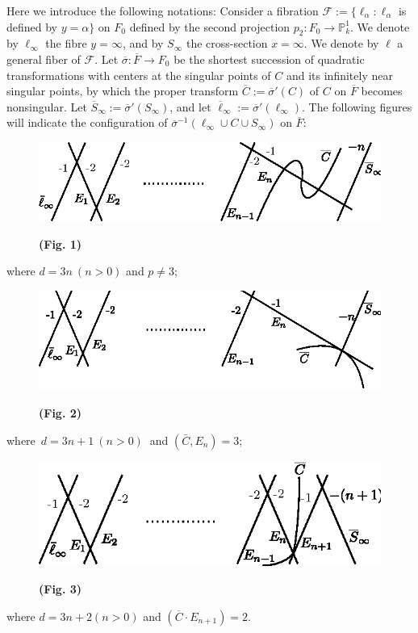 \subsubsection{}\label{chap3:2.5.1}
Here we introduce the following notations: Consider a fibration
$\mathscr{F}:=\{\ell_{\alpha}:\ell_{\alpha}$ is defined by
$y=\alpha\}$ on $F_{0}$ defined by the second projection
$p_{2}:F_{0}\to \mathbb{P}^{1}_{k}$. We denote by $\ell_{\infty}$ the
fibre $y=\infty$, and by $S_{\infty}$ the cross-section $x=\infty$. We
denote by $\ell$ a general fiber of $\mathscr{F}$. Let
$\overline{\sigma}:\overline{F}\to F_{0}$ be the shortest succession
of quadratic transformations with centers at the singular points of
$C$ and its infinitely near singular points, by which the proper
transform $\overline{C}:=\overline{\sigma}'(C)$ of $C$ on
$\overline{F}$ becomes nonsingular. Let
$\overline{S}_{\infty}:=\overline{\sigma}'(S_{\infty})$, and let
$\overline{\ell}_{\infty}:=\overline{\sigma}'(\ell_{\infty})$. The
following figures will indicate the configuration of
$\overline{\sigma}^{-1}(\ell_{\infty}\cup C\cup S_{\infty})$ on
$\overline{F}:$
\begin{figure}[H]
\centering
\includegraphics[scale=1.2]{figures/miyansi_fig1.eps}

\bigskip
\centerline{\bf(Fig. 1)}
\end{figure}
\noindent 
where $d=3n ~(n>0)$ and $p\neq 3$;

\begin{figure}[H]
\centering
\includegraphics[scale=1.2]{figures/miyansi_fig2.eps}

\bigskip
\centerline{\bf(Fig. 2)}
\end{figure}
\noindent
where\pageoriginale\ $d=3n+1 ~(n>0)~$ and $(\bar{C}, E_n)=3$;
\begin{figure}[H]
\centering
\includegraphics{figures/miyansi_fig3.eps}

\bigskip
\centerline{\bf(Fig. 3)}
\end{figure}
\noindent
where $d=3n+2(n>0)$ and $(\overline{C}\cdot E_{n+1})=2$.

